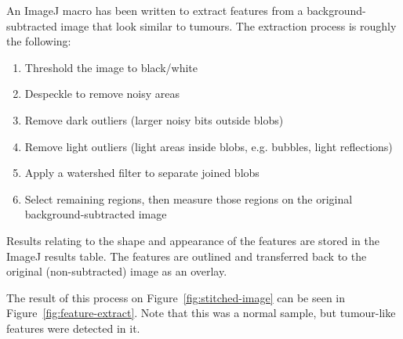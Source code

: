 \documentclass[a4paper]{scrartcl}
\begin{document}
An ImageJ macro has been written to extract features from a
background-subtracted image that look similar to tumours. The
extraction process is roughly the following:

\begin{enumerate}
\item Threshold the image to black/white
\item Despeckle to remove noisy areas
\item Remove dark outliers (larger noisy bits outside blobs)
\item Remove light outliers (light areas inside blobs, e.g. bubbles,
  light reflections)
\item Apply a watershed filter to separate joined blobs
\item Select remaining regions, then measure those regions on the
  original background-subtracted image
\end{enumerate}

Results relating to the shape and appearance of the features are
stored in the ImageJ results table. The features are outlined and
transferred back to the original (non-subtracted) image as an overlay.

The result of this process on Figure~\ref{fig:stitched-image} can be
seen in Figure~\ref{fig:feature-extract}. Note that this was a normal
sample, but tumour-like features were detected in it.


\end{document}

